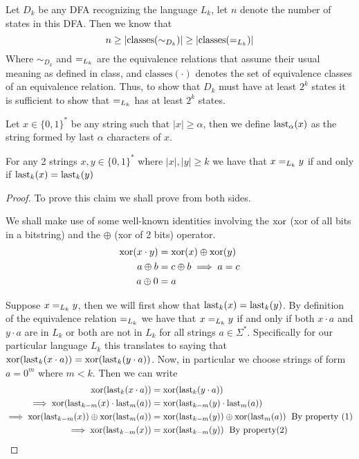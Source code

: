 \providecommand{\equival}{\ensuremath =_{L_k}}
\providecommand{\last}[2]{\ensuremath \takelast_{#1} (#2)}

\begin{soln}

Let $D_k$ be any DFA recognizing the language $L_k$, let $n$ denote the number of states in this DFA. Then we know that
\[
    n \geq |\text{classes}(\sim_{D_k})| \geq |\text{classes}(\equival)|
\]
Where $\sim_{D_k}$ and $\equival$ are the equivalence relations that assume their usual meaning as defined in class, and $\text{classes}(\cdot)$ denotes the set of equivalence classes of an equivalence relation. Thus, to show that $D_k$ must have at least $2^k$ states it is sufficient to show that $\equival$ has at least $2^k$ states.

\begin{notn}
Let $x \in \{0, 1\}^*$ be any string such that $|x| \geq \alpha$, then we define $\last{\alpha}{x}$ as the string formed by last $\alpha$ characters of $x$.
\end{notn}

\begin{claim}
For any 2 strings $x,y \in \{0, 1\}^*$ where $|x|, |y| \geq k$ we have that $x \equival y$ if and only if $\last{k}{x} = \last{k}{y}$
\end{claim}
\begin{proof}
To prove this claim we shall prove from both sides.\\

\begin{note}
We shall make use of some well-known identities involving the $\operatorname{xor}$ (xor of all bits in a bitstring) and the $\oplus$ (xor of 2 bits) operator.
\begin{align}
    \operatorname{xor}(x \cdot y) &= \operatorname{xor}(x) \oplus \operatorname{xor}(y) \\
    a \oplus b &= c \oplus b \implies a = c \\
    a \oplus 0 &= a
\end{align}
\end{note}

Suppose $x \equival y$, then we will first show that $\last{k}{x} = \last{k}{y}$. By definition of the equivalence relation $\equival$ we have that $x \equival y$ if and only if both $x \cdot a$ and $y \cdot a$ are in $L_k$ or both are not in $L_k$ for all strings $a \in \Sigma^*$. Specifically for our particular language $L_k$ this translates to saying that $\xor(\last{k}{x \cdot a}) = \xor(\last{k}{y \cdot a})$. Now, in particular we choose strings of form $a = 0^m$ where $m < k$. Then we can write
\begin{align*}
    \xor(\last{k}{x \cdot a}) &= \xor(\last{k}{y \cdot a}) \\
    \implies \xor(\last{k-m}{x} \cdot \last{m}{a}) &= \xor(\last{k-m}{y} \cdot \last{m}{a})\\
    \implies \xor(\last{k-m}{x}) \oplus \xor(\last{m}{a}) &= \xor(\last{k-m}{y}) \oplus \xor(\last{m}{a}) \; \text{ By property (1)}\\
    \implies \xor(\last{k-m}{x}) &= \xor(\last{k-m}{y}) \; \text{ By property(2)}\\
\end{align*}


\end{proof}
\end{soln}
